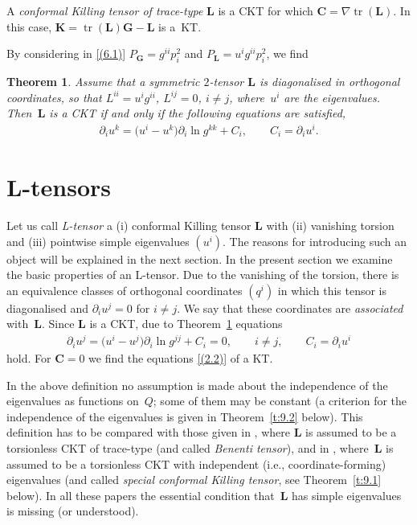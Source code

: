 \documentclass[pdftex]{sigma}
\def\bs{\boldsymbol}
\numberwithin{equation}{section}
\newtheorem{Theorem}{Theorem}[section]
 { \theoremstyle{definition}
\newtheorem{Notation}[Theorem]{Notation}
\newtheorem{Example}[Theorem]{Example}
\newtheorem{Remark}[Theorem]{Remark}
\newtheorem{Remarks}[Theorem]{Remarks}
 }
\begin{document}
A {\it conformal Killing tensor of trace-type} $\bs L$ is a CKT for which $\bs C=\nabla\operatorname{tr}(\bs L)$.
In this case, $\bs K= \operatorname{tr}(\bs L) \bs G-\bs L$ is a~KT.

By considering in \eqref{(6.1)} $P_{\bs G}=g^{ii}p_i^2$ and $P_{\bs L}=u^ig^{ii}p_i^2$, we f\/ind

\begin{Theorem}\label{t:6.2}
Assume that a symmetric $2$-tensor $\bs L$ is diagonalised in orthogonal coordinates, so that $L^{ii}=u^i g^{ii}$, $L^{ij}=0$, $i\neq j$, where~$u^i$ are the eigenvalues. Then~$\bs L$ is a CKT if and only if the following equations are satisfied,
\begin{gather}
\partial_iu^k=\big(u^i-u^k\big) \partial_i\ln g^{kk}+C_i, \qquad
C_i=\partial_iu^i.
\label{(6.2)}
\end{gather}
\end{Theorem}

\section{L-tensors}\label{section7}

Let us call {\it L{\rm-}tensor} a (i) conformal Killing tensor $\bs L$ with (ii) vanishing torsion and (iii) pointwise simple eigenvalues $(u^i)$. The reasons for introducing such an object will be explained in the next section. In the present section we examine the basic properties of an L-tensor. Due to the vanishing of the torsion, there is an equivalence classes of orthogonal coordinates $(q^i)$ in which this tensor is diagonalised and $\partial_iu^j=0$ for $i\neq j$. We say that these coordinates are {\it associated} with~$\bs L$. Since $\bs L$ is a CKT, due to Theorem~\ref{t:6.2} equations
\begin{gather}
\partial_iu^j=\big(u^i-u^j\big)\partial_i\ln g^{jj}+C_i=0, \qquad i\neq j, \qquad
C_i=\partial_iu^i
\label{(7.1)}
\end{gather}
hold. For $\bs C=0$ we f\/ind the equations \eqref{(2.2)} of a KT.


\begin{Remark}  In the above def\/inition no assumption is made about the independence of the eigenvalues as functions on~$Q$; some of them may be constant (a criterion for the independence of the eigenvalues is given in Theorem~\ref{t:9.2} below). This def\/inition has to be compared with those given in \cite{Blaszak-2003, Bolsinov-Matveev-2003, Ibort-Magri-Marmo-2000}, where $\bs L$ is assumed to be a torsionless CKT of trace-type (and called {\it Benenti tensor}), and in \cite{Crampin-2003a,Crampin-2003b}, where~$\bs L$ is assumed to be a torsionless CKT with independent (i.e., coordinate-forming) eigenvalues (and called {\it special conformal Killing tensor}, see Theorem~\ref{t:9.1} below). In all these papers the essential condition that~$\bs L$ has simple eigenvalues is missing (or understood).
\end{Remark}
\end{document}
